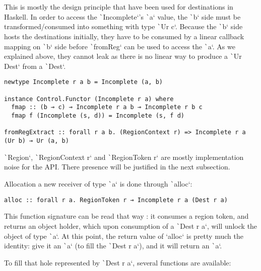\documentclass[english]{jflart}
\begin{document}
This is mostly the design principle that have been used for destinations in Haskell. In order to access the \texttt`Incomplete`'s \texttt`a` value, the \texttt`b` side must be transformed/consumed into something with type \texttt`Ur c`. Because the \texttt`b` side hosts the destinations initially, they have to be consumed by a linear callback mapping on \texttt`b` side before \texttt`fromReg` can be used to access the \texttt`a`. As we explained above, they cannot leak as there is no linear way to produce a \texttt`Ur Dest` from a \texttt`Dest`.

\begin{verbatim}
newtype Incomplete r a b = Incomplete (a, b)

instance Control.Functor (Incomplete r a) where
  fmap :: (b ⊸ c) ⊸ Incomplete r a b ⊸ Incomplete r b c
  fmap f (Incomplete (s, d)) = Incomplete (s, f d)

fromRegExtract :: forall r a b. (RegionContext r) => Incomplete r a (Ur b) ⊸ Ur (a, b)
\end{verbatim}

\texttt`Region`, \texttt`RegionContext r` and \texttt`RegionToken r` are mostly implementation noise for the API. There presence will be justified in the next subsection.

Allocation a new receiver of type \texttt`a` is done through \texttt`alloc`:

\begin{verbatim}
alloc :: forall r a. RegionToken r ⊸ Incomplete r a (Dest r a)
\end{verbatim}

This function signature can be read that way : it consumes a region token, and returns an object holder, which upon consumption of a \texttt`Dest r a`, will unlock the object of type \texttt`a`. At this point, the return value of `alloc` is pretty much the identity: give it an \texttt`a` (to fill the \texttt`Dest r a`), and it will return an \texttt`a`.

To fill that hole represented by \texttt`Dest r a`, several functions are available:
\end{document}
